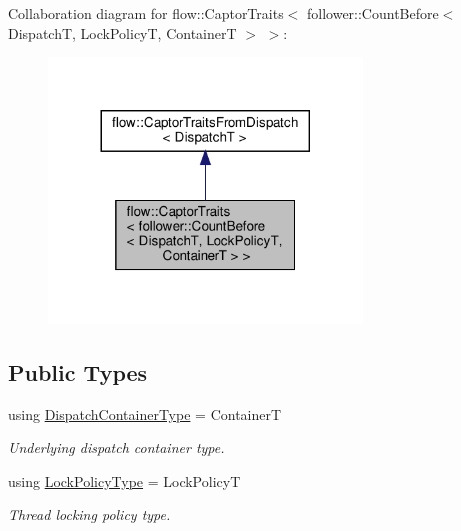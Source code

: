 Collaboration diagram for flow\+:\+:Captor\+Traits$<$ follower\+:\+:Count\+Before$<$ DispatchT, Lock\+PolicyT, ContainerT $>$ $>$\+:\nopagebreak
\begin{figure}[H]
\begin{center}
\leavevmode
\includegraphics[width=236pt]{structflow_1_1_captor_traits_3_01follower_1_1_count_before_3_01_dispatch_t_00_01_lock_policy_t_0921e31be6500fb23386855a994fc7ec9}
\end{center}
\end{figure}
\subsection*{Public Types}
\begin{DoxyCompactItemize}
\item 
\mbox{\label{structflow_1_1_captor_traits_3_01follower_1_1_count_before_3_01_dispatch_t_00_01_lock_policy_t_00_01_container_t_01_4_01_4_a10a4df96151647bd0f5570a35505894d}} 
using \hyperlink{structflow_1_1_captor_traits_3_01follower_1_1_count_before_3_01_dispatch_t_00_01_lock_policy_t_00_01_container_t_01_4_01_4_a10a4df96151647bd0f5570a35505894d}{Dispatch\+Container\+Type} = ContainerT
\begin{DoxyCompactList}\small\item\em Underlying dispatch container type. \end{DoxyCompactList}\item 
\mbox{\label{structflow_1_1_captor_traits_3_01follower_1_1_count_before_3_01_dispatch_t_00_01_lock_policy_t_00_01_container_t_01_4_01_4_a45fdf2fbf86dba54ad249029bd66886c}} 
using \hyperlink{structflow_1_1_captor_traits_3_01follower_1_1_count_before_3_01_dispatch_t_00_01_lock_policy_t_00_01_container_t_01_4_01_4_a45fdf2fbf86dba54ad249029bd66886c}{Lock\+Policy\+Type} = Lock\+PolicyT
\begin{DoxyCompactList}\small\item\em Thread locking policy type. \end{DoxyCompactList}\end{DoxyCompactItemize}


